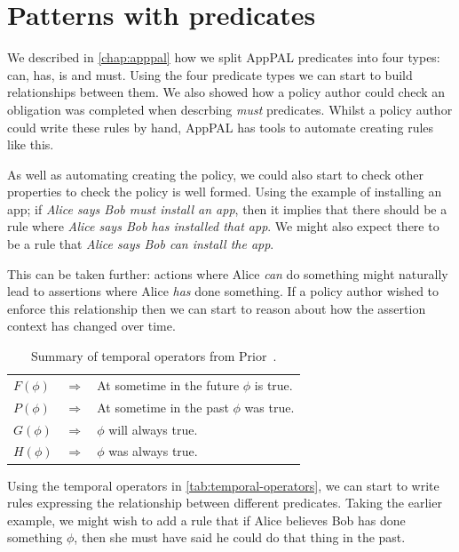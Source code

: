 \documentclass[thesis.tex]{subfiles}
\begin{document}
\section{Patterns with predicates}

We described in \autoref{chap:apppal} how we split AppPAL predicates into four types: can, has, is and must.
Using the four predicate types we can start to build relationships between them.
We also showed how a policy author could check an obligation was completed when
descrbing \emph{must} predicates.  Whilst a policy author could write these
rules by hand, AppPAL has tools to automate creating rules like this.

As well as automating creating the policy, we could also start to check other
properties to check the policy is well formed. Using the example of installing
an app; if \emph{Alice says Bob must install
  an app}, then it implies that there should be a rule where \emph{Alice says
Bob has installed that app}.  We might also expect there to be a rule that
\emph{Alice says Bob can install the app}.

This can be taken further: actions where Alice \emph{can} do something might
naturally lead to assertions where Alice \emph{has} done something.  If a policy
author wished to enforce this relationship then we can start to reason about how the
assertion context has changed over time.

\begin{table}\centering
  \begin{tabular}{l c l}
    \toprule
      $F(\phi)$ & $\Rightarrow$ & At sometime in the future $\phi$ is true. \\
      $P(\phi)$ & $\Rightarrow$ & At sometime in the past $\phi$ was true. \\
      $G(\phi)$ & $\Rightarrow$ & $\phi$ will always true. \\
      $H(\phi)$ & $\Rightarrow$ & $\phi$ was always true. \\
    \bottomrule
  \end{tabular}
  \caption{Summary of temporal operators from Prior~\cite{arthur_n._prior_past_1967}.}
  \label{tab:temporal-operators}
\end{table}

Using the temporal operators in \autoref{tab:temporal-operators}, we can start
to write rules expressing the relationship between different predicates. Taking
the earlier example, we might wish to add a rule that if Alice believes Bob has
done something $\phi$, then she must have said he could do that thing in the
past.
\end{document}
